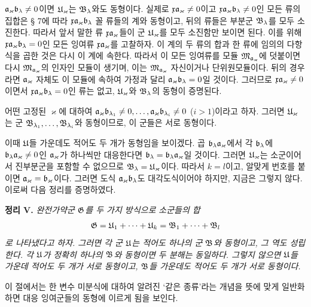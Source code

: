 \(\mathfrak{a}_\varkappa\mathfrak{b}_\lambda\ne0\)이면 \(\mathfrak U_\varkappa\)는 \(\mathfrak B_\lambda\)와도 동형이다. 실제로 \(\mathfrak x\mathfrak{a}_\varkappa\ne0\)이고 \(\mathfrak x\mathfrak{a}_\varkappa\mathfrak{b}_\lambda\ne0\)인 모든 류의 집합은 § 7에 따라 \(\mathfrak x\mathfrak{a}_\varkappa\mathfrak{b}_\lambda\) 꼴 류들의 계와 동형이고, 뒤의 류들은 부분군 \(\mathfrak B_\lambda\)를 모두 소진한다. 따라서 앞서 말한 류 \(\mathfrak x\mathfrak{a}_\varkappa\)들이 군 \(\mathfrak U_\varkappa\)를 모두 소진함만 보이면 된다. 이를 위해 \(\mathfrak x\mathfrak{a}_\varkappa\mathfrak{b}_\lambda=0\)인 모든 잉여류 \(\mathfrak x\mathfrak{a}_\varkappa\)를 고찰하자. 이 계의 두 류의 합과 한 류에 임의의 다항식을 곱한 것은 다시 이 계에 속한다. 따라서 이 모든 잉여류를 모듈 \(\mathfrak M_{\mathfrak{a}_\varkappa}\)에 덧붙이면 다시 \(\mathfrak M_{\mathfrak{a}_\varkappa}\)의 인자인 모듈이 생기며, 이는 \(\mathfrak M_{\mathfrak{a}_\varkappa}\) 자신이거나 단위원모듈이다. 뒤의 경우라면 \(\mathfrak{a}_\varkappa\) 자체도 이 모듈에 속하여 가정과 달리 \(\mathfrak{a}_\varkappa\mathfrak{b}_\lambda=0\)일 것이다. 그러므로 \(\mathfrak x\mathfrak{a}_\varkappa\ne0\)이면서 \(\mathfrak x\mathfrak{a}_\varkappa\mathfrak{b}_\lambda=0\)인 류는 없고, \(\mathfrak U_\varkappa\)와 \(\mathfrak B_\lambda\)의 동형이 증명된다.

어떤 고정된 \(\varkappa\)에 대하여 \(\mathfrak{a}_\varkappa\mathfrak{b}_{\lambda_1}\ne0,\ldots,\mathfrak{a}_\varkappa\mathfrak{b}_{\lambda_i}\ne0\) (\(i>1\))이라고 하자. 그러면 \(\mathfrak U_\varkappa\)는 군 \(\mathfrak B_{\lambda_1},\ldots,\mathfrak B_{\lambda_i}\)와 동형이므로, 이 군들은 서로 동형이다.

이때 \(\mathfrak U\)들 가운데도 적어도 두 개가 동형임을 보이겠다. 곱 \(\mathfrak{b}_\lambda\mathfrak{a}_\varkappa\)에서 각 \(\mathfrak{b}_\lambda\)에 \(\mathfrak{b}_\lambda\mathfrak{a}_\varkappa\ne0\)인 \(\mathfrak{a}_\varkappa\)가 하나씩만 대응한다면 \(\mathfrak{b}_\lambda=\mathfrak{b}_\lambda\mathfrak{a}_\varkappa\)일 것이다. 그러면 \(\mathfrak U_\varkappa\)는 소군이어서 진부분군을 포함할 수 없으므로 \(\mathfrak B_\lambda=\mathfrak U_\varkappa\)이다. 따라서 \(k=l\)이고, 알맞게 번호를 붙이면 \(\mathfrak{a}_\varkappa=\mathfrak{b}_\varkappa\)이다. 그러면 도식 \(\mathfrak{a}_\varkappa\mathfrak{b}_\lambda\)도 대각도식이어야 하지만, 지금은 그렇지 않다. 이로써 다음 정리를 증명하였다.

\textbf{정리 V.} \emph{완전가약군 \(\mathfrak G\)를 두 가지 방식으로 소군들의 합
\[
 \mathfrak G=\mathfrak U_1+\cdots+\mathfrak U_k=\mathfrak B_1+\cdots+\mathfrak B_l
\]
로 나타냈다고 하자. 그러면 각 군 \(\mathfrak U\)는 적어도 하나의 군 \(\mathfrak B\)와 동형이고, 그 역도 성립한다. 각 \(\mathfrak U\)가 정확히 하나의 \(\mathfrak B\)와 동형이면 두 분해는 동일하다. 그렇지 않으면 \(\mathfrak U\)들 가운데 적어도 두 개가 서로 동형이고, \(\mathfrak B\)들 가운데도 적어도 두 개가 서로 동형이다.}


이 절에서는 한 변수 미분식에 대하여 알려진 ‘같은 종류’라는 개념을 뜻에 맞게 일반화하면 대응 잉여군들의 동형에 이르게 됨을 보인다.

